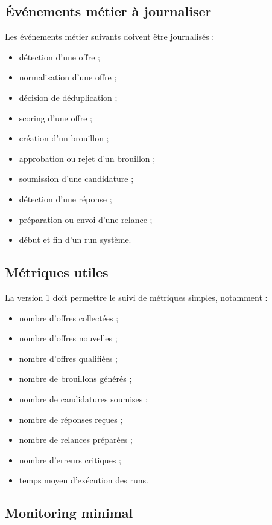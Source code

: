 \documentclass[11pt,a4paper]{article}
\begin{document}
\subsection{Événements métier à journaliser}

Les événements métier suivants doivent être journalisés :

\begin{itemize}
    \item détection d’une offre ;
    \item normalisation d’une offre ;
    \item décision de déduplication ;
    \item scoring d’une offre ;
    \item création d’un brouillon ;
    \item approbation ou rejet d’un brouillon ;
    \item soumission d’une candidature ;
    \item détection d’une réponse ;
    \item préparation ou envoi d’une relance ;
    \item début et fin d’un run système.
\end{itemize}

\subsection{Métriques utiles}

La version 1 doit permettre le suivi de métriques simples, notamment :

\begin{itemize}
    \item nombre d’offres collectées ;
    \item nombre d’offres nouvelles ;
    \item nombre d’offres qualifiées ;
    \item nombre de brouillons générés ;
    \item nombre de candidatures soumises ;
    \item nombre de réponses reçues ;
    \item nombre de relances préparées ;
    \item nombre d’erreurs critiques ;
    \item temps moyen d’exécution des runs.
\end{itemize}

\subsection{Monitoring minimal}
\end{document}
